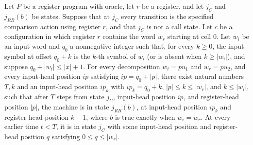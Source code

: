 \begin{lemma}
\label{Complexity.LogProg.cmpPlain_run}
\leanok
{}
Let $P$ be a register program with oracle, let $r$ be a register, and let $j_C$ and
$j_{RB}(b)$ be states. Suppose that at $j_C$ every transition is the specified
comparison action using register $r$, and that $j_C$ is not a call state. Let $c$ be a
configuration in which register $r$ contains the word $w_r$ starting at cell $0$. Let
$w_i$ be an input word and $q_0$ a nonnegative integer such that, for every $k\ge 0$,
the input symbol at offset $q_0+k$ is the $k$-th symbol of $w_i$ (or is absent when
$k\ge |w_i|$), and suppose $q_0+|w_i|\le |x|+1$. For every decomposition $w_i=p u_1$ and
$w_r=p u_2$, and every input-head position $ip$ satisfying $ip=q_0+|p|$, there exist
natural numbers $T,k$ and an input-head position $ip_k$ with $ip_k=q_0+k$, $|p|\le k\le
|w_r|$, and $k\le |w_i|$, such that after $T$ steps from state $j_C$, input-head
position $ip$, and register-head position $|p|$, the machine is in state $j_{RB}(b)$, at
input-head position $ip_k$ and register-head position $k-1$, where $b$ is true exactly
when $w_i=w_r$. At every earlier time $t<T$, it is in state $j_C$ with some input-head
position and register-head position $q$ satisfying $0\le q\le |w_r|$.
\end{lemma}

